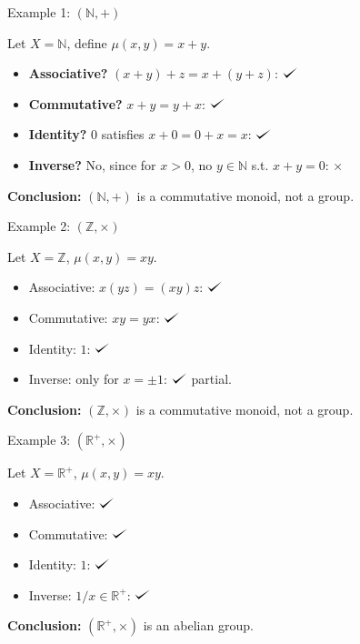 \documentclass[11pt,aspectratio=43,ignorenonframetext,t]{beamer}
\def\checkmark{\tikz\fill[scale=0.4](0,.35) -- (.25,0) -- (1,.7) -- (.25,.15) -- cycle;}
\begin{document}
\begin{frame}{Example 1: $(\mathbb{N}, +)$}
\begin{block}{}
    Let \(X = \mathbb{N}\), define \(\mu(x,y)=x+y\).

\begin{itemize}
  \item \textbf{Associative?} \((x+y)+z = x+(y+z)\): $\checkmark$
  \item \textbf{Commutative?} \(x+y = y+x\): $\checkmark$
  \item \textbf{Identity?} \(0\) satisfies \(x+0 = 0+x = x\): $\checkmark$
  \item \textbf{Inverse?} No, since for \(x>0\), no \(y\in\mathbb{N}\) s.t. \(x+y=0\): $\times$
\end{itemize}

\textbf{Conclusion:} $(\mathbb{N},+)$ is a commutative monoid, not a group.
\end{block}
\end{frame}

\begin{frame}{Example 2: $(\mathbb{Z}, \times)$}
\begin{block}{}
    Let \(X = \mathbb{Z}\), \(\mu(x,y)=xy\).

\begin{itemize}
  \item Associative: \(x(yz) = (xy)z\): $\checkmark$
  \item Commutative: \(xy = yx\): $\checkmark$
  \item Identity: \(1\): $\checkmark$
  \item Inverse: only for \(x = \pm 1\): $\checkmark$ partial.
\end{itemize}

\textbf{Conclusion:} $(\mathbb{Z},\times)$ is a commutative monoid, not a group.
\end{block}
\end{frame}

\begin{frame}{Example 3: $(\mathbb{R}^+, \times)$}
\begin{block}{}
    Let \(X = \mathbb{R}^+\), \(\mu(x,y)=xy\).

\begin{itemize}
  \item Associative: $\checkmark$
  \item Commutative: $\checkmark$
  \item Identity: \(1\): $\checkmark$
  \item Inverse: \(1/x \in \mathbb{R}^+\): $\checkmark$
\end{itemize}

\textbf{Conclusion:} $(\mathbb{R}^+, \times)$ is an abelian group.
\end{block}
\end{frame}
\end{document}

